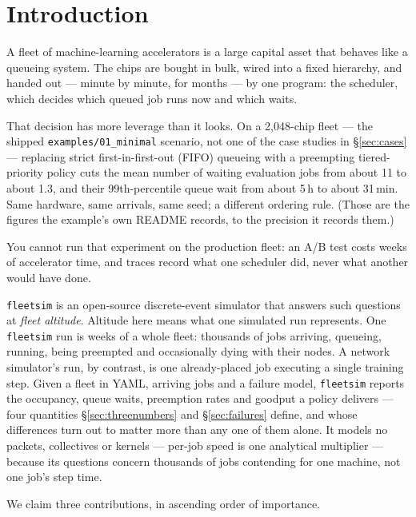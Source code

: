\section{Introduction}
\label{sec:intro}

A fleet of machine-learning accelerators is a large capital asset that behaves
like a queueing system. The chips are bought in bulk, wired into a fixed
hierarchy, and handed out --- minute by minute, for months --- by one program:
the scheduler, which decides which queued job runs now and which waits.

That decision has more leverage than it looks. On a 2{,}048-chip fleet --- the
shipped \texttt{examples/01\_minimal} scenario, not one of the case studies in
\S\ref{sec:cases} --- replacing strict first-in-first-out (FIFO) queueing with a
preempting tiered-priority policy cuts the mean number of waiting evaluation
jobs from about 11 to about 1.3, and their 99th-percentile queue wait from about
5\,h to about 31\,min. Same hardware, same arrivals, same seed; a different
ordering rule. (Those are the figures the example's own README records, to the
precision it records them.)

You cannot run that experiment on the production fleet: an A/B test costs weeks
of accelerator time, and traces record what one scheduler did, never what another
would have done.

\texttt{fleetsim} is an open-source discrete-event simulator that answers such
questions at \emph{fleet altitude}. Altitude here means what one simulated run
represents. One \texttt{fleetsim} run is weeks of a whole fleet: thousands of
jobs arriving, queueing, running, being preempted and occasionally dying with
their nodes. A network simulator's run, by contrast, is one already-placed job
executing a single training step. Given a fleet in YAML, arriving jobs and a
failure model, \texttt{fleetsim} reports the occupancy, queue waits, preemption
rates and goodput a policy delivers --- four quantities
\S\ref{sec:threenumbers} and \S\ref{sec:failures} define, and whose differences
turn out to matter more than any one of them alone. It models no packets,
collectives or kernels --- per-job speed is one analytical multiplier ---
because its questions concern thousands of jobs contending for one machine, not
one job's step time.

We claim three contributions, in ascending order of importance.

